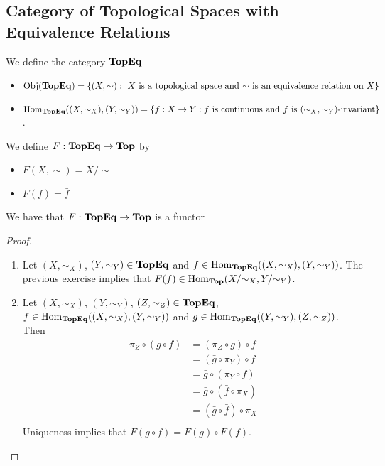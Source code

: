 \documentclass{book}
\begin{document}
	\subsection{Category of Topological Spaces with Equivalence Relations}

	\begin{defn}  
		We define the category $\operatorname*{\text{\textbf{TopEq}}}$ 
		\begin{itemize}
			\item $\operatorname{Obj}(\operatorname*{\text{\textbf{TopEq}}}) = \{(X, \sim):  \text{ $X$ is a topological space and $\sim$ is an equivalence relation on $X$}\}$
			\item $\operatorname{Hom}_{\operatorname*{\text{\textbf{TopEq}}}}((X, \sim_X), (Y, \sim_Y)) = \{f: X \rightarrow Y: \text{$f$ is continuous and $f$ is $(\sim_X, \sim_Y)$-invariant}\}$. 
		\end{itemize}
	\end{defn}

	\begin{defn}  
		We define $F: \operatorname*{\text{\textbf{TopEq}}} \rightarrow \operatorname*{\text{\textbf{Top}}}$ by
		\begin{itemize}
			\item $F(X, \sim) = X/\sim$
			\item $F(f) = \bar{f}$
		\end{itemize}
	\end{defn}

	\begin{ex}  
		We have that $F: \operatorname*{\text{\textbf{TopEq}}} \rightarrow \operatorname*{\text{\textbf{Top}}}$ is a functor
	\end{ex}

	\begin{proof}\
		\begin{enumerate}
			\item Let $(X, \sim_X)$, $(Y, \sim_Y) \in \operatorname*{\text{\textbf{TopEq}}}$ and $f \in \operatorname{Hom}_{\operatorname*{\text{\textbf{TopEq}}}}((X, \sim_X), (Y, \sim_Y))$. The previous exercise implies that $F(f) \in \operatorname{Hom}_{\operatorname*{\text{\textbf{Top}}}}(X/{\sim_X}, Y/ {\sim_Y})$. 
			\item  Let $(X, \sim_X)$, $(Y, \sim_Y)$, $(Z, \sim_Z) \in \operatorname*{\text{\textbf{TopEq}}}$,  $f \in \operatorname{Hom}_{\operatorname*{\text{\textbf{TopEq}}}}((X, \sim_X), (Y, \sim_Y))$ and $g \in \operatorname{Hom}_{\operatorname*{\text{\textbf{TopEq}}}}((Y, \sim_Y), (Z, \sim_Z))$. Then 
			\begin{align*}
				\pi_Z \circ (g \circ f)
				& = (\pi_Z \circ g) \circ f \\
				& = (\bar{g} \circ \pi_Y) \circ f \\
				& = \bar{g} \circ (\pi_Y \circ f) \\
				& = \bar{g} \circ (\bar{f} \circ \pi_X) \\
				& = (\bar{g} \circ \bar{f}) \circ \pi_X \\
			\end{align*}
			Uniqueness implies that $F(g \circ f) = F(g) \circ F(f)$. 
		\end{enumerate}
	\end{proof}
\end{document}
